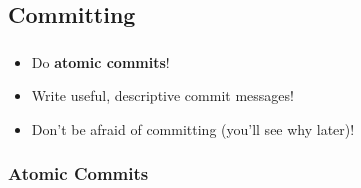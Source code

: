 
\subsection{Committing}

\begin{frame}

  \begin{center}
    \textbf{\Huge{\insertsubsection}}
  \end{center}

\end{frame}


\begin{frame}
  \frametitle{\insertsubsection}

  \begin{center}
    \begin{itemize}
      \item Do \textbf{atomic commits}!
      \item Write useful, descriptive commit messages!
      \item Don't be afraid of committing (you'll see why later)!
    \end{itemize}
  \end{center}

\end{frame}


\subsubsection{Atomic Commits}


